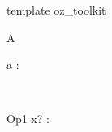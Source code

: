 \begin{zsection}
  \SECTION template \parents oz\_toolkit
\end{zsection}

\begin{class}{A}
  \begin{state}
    a : \nat
  \end{state}\\
  \begin{op}{Op1}
    x? : \nat
  \end{op}
\end{class}
